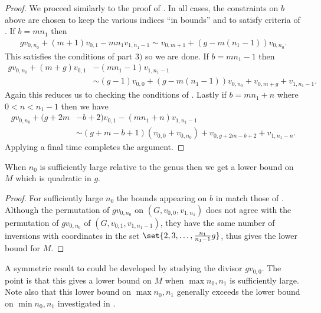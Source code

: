 \begin{proof}
    We proceed similarly to the proof of . In all cases, the constraints on $b$ above are chosen to keep the various indices ``in bounds'' and to satisfy criteria of . If $b = mn_1$ then
    \begin{align*}
        gv_{0,n_0}+(m+1)v_{0,1}-mn_1v_{1,n_1-1} \sim v_{0,m+1} + (g-m(n_1-1))v_{0,n_0}.
    \end{align*}
    This satisfies the conditions of  part $3)$ so we are done. If $b = mn_1-1$ then
    \begin{align*}
        gv_{0,n_0}+(m+g)v_{0,1}&-(mn_1-1)v_{1,n_1-1} \\&\sim (g-1)v_{0,0} + (g-m(n_1-1))v_{0,n_0}+v_{0,m+g}+v_{1,n_1-1}.
    \end{align*}
    Again this reduces us to checking the conditions of .
    Lastly if $b = mn_1 +n$ where $0<n<n_1-1$ then we have
    \begin{align*}
        gv_{0,n_0}+(g+2m&-b+2)v_{0,1}-(mn_1+n)v_{1,n_1-1} \\
        &\sim (g+m-b+1)(v_{0,0}+v_{0,n_0}) + v_{0,g+2m-b+2} + v_{1,n_1-n}.
    \end{align*}
    Applying  a final time completes the argument.
\end{proof}

\begin{coro}\label{cor-bothOffMax}
    When $n_0$ is sufficiently large relative to the genus then we get a lower bound on $M$ which is quadratic in $g$.
\end{coro}

\begin{proof}
    For sufficiently large $n_0$ the bounds appearing on $b$ in  match those of . Although the permutation of $gv_{0,n_0}$ on $(G,v_{0,0},v_{1,n_1})$ does not agree with the permutation of $gv_{0,n_0}$ of $(G,v_{0,1},v_{1,n_1-1})$, they have the same number of inversions with coordinates in the set $\set{2,3,\dots,\frac{n_1}{n_1-1}g}$, thus  gives the lower bound for $M$.
\end{proof}

\begin{rema}
    A symmetric result to  could be developed by studying the divisor $gv_{0,0}$. The point is that this gives a lower bound on $M$ when $\max{n_0,n_1}$ is sufficiently large. Note also that this lower bound on $\max{n_0,n_1}$ generally exceeds the lower bound on $\min{n_0,n_1}$ investigated in .
\end{rema}


